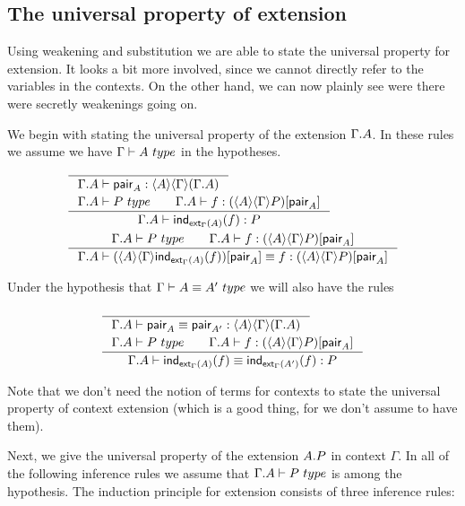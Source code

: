 \subsection{The universal property of extension}

Using weakening and substitution we are able to state the universal property
for extension. It looks a bit more involved, since we cannot directly refer
to the variables in the contexts. On the other hand, we can now plainly see
were there were secretly weakenings going on.

We begin with stating the universal property of the extension $\ctxext{\Gamma}{A}$.
In these rules we assume we have $\jtype{\Gamma}{A}$ in the hypotheses.
\begin{align}
& \inference{}
{\jterm{\ctxext{\Gamma}{A}}{\ctxwk{A}{{\Gamma}{\ctxext{\Gamma}{A}}}}{\pair_A}}\\
& \inference{
  \jtype{\ctxext{\Gamma}{A}}{P}
  \qquad
  \jterm{\ctxext{\Gamma}{A}}{\subst{\pair_A}{\ctxwk{A}{{\Gamma}{P}}}}{f}}
  {\jterm{\ctxext{\Gamma}{A}}{P}{\ind{\tfext_\Gamma(A)}(f)}}\\
& \inference{
  \jtype{\ctxext{\Gamma}{A}}{P}
  \qquad
  \jterm{\ctxext{\Gamma}{A}}{\subst{\pair_A}{\ctxwk{A}{{\Gamma}{P}}}}{f}}
  {\jtermeq{\ctxext{\Gamma}{A}}{\subst{\pair_A}{\ctxwk{A}{{\Gamma}{P}}}}{\subst{\pair_A}{\ctxwk{A}{{\Gamma}{\ind{\tfext_\Gamma(A)}(f)}}}}{f}}
\end{align}

Under the hypothesis that $\jtypeeq{\Gamma}{A}{A'}$
we will also have the rules

\begin{align}
& \inference{}{\jtermeq{\ctxext{\Gamma}{A}}{\ctxwk{A}{{\Gamma}{\ctxext{\Gamma}{A}}}}{\pair_A}{\pair_{A'}}}\\
& \inference{\jtype{\ctxext{\Gamma}{A}}{P}\qquad\jterm{\ctxext{\Gamma}{A}}{\subst{\pair_A}{\ctxwk{A}{{\Gamma}{P}}}}{f}}
{\jtermeq{\ctxext{\Gamma}{A}}{P}{\ind{\tfext_\Gamma(A)}(f)}{\ind{\tfext_\Gamma(A')}(f)}}
\end{align}

Note that we don't need the notion of terms for contexts to state the universal
property of context extension (which is a good thing, for we don't assume to have them).

Next, we give the universal property of the extension $\ctxext{A}{P}$ in context
$\Gamma$.
In all of the following inference rules we assume that $\jtype{\ctxext{\Gamma}{A}}{P}$
is among the hypothesis. The induction principle for extension consists of three
inference rules:

